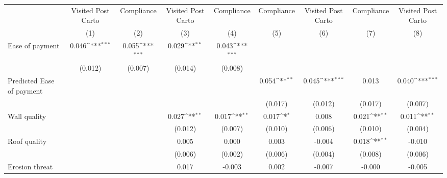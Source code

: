 {
\def\sym#1{\ifmmode^{#1}\else\(^{#1}\)\fi}
\begin{tabular}{l*{8}{c}}
\hline\hline
                &\multicolumn{1}{c}{Visited Post Carto}&\multicolumn{1}{c}{Compliance}&\multicolumn{1}{c}{Visited Post Carto}&\multicolumn{1}{c}{Compliance}&\multicolumn{1}{c}{Compliance}&\multicolumn{1}{c}{Visited Post Carto}&\multicolumn{1}{c}{Compliance}&\multicolumn{1}{c}{Visited Post Carto}\\
                &\multicolumn{1}{c}{(1)}         &\multicolumn{1}{c}{(2)}         &\multicolumn{1}{c}{(3)}         &\multicolumn{1}{c}{(4)}         &\multicolumn{1}{c}{(5)}         &\multicolumn{1}{c}{(6)}         &\multicolumn{1}{c}{(7)}         &\multicolumn{1}{c}{(8)}         \\
\hline
Ease of payment &    0.046\sym{***}&    0.055\sym{***}&    0.029\sym{**} &    0.043\sym{***}&                  &                  &                  &                  \\
                &  (0.012)         &  (0.007)         &  (0.014)         &  (0.008)         &                  &                  &                  &                  \\
Predicted Ease of payment&                  &                  &                  &                  &    0.054\sym{**} &    0.045\sym{***}&    0.013         &    0.040\sym{***}\\
                &                  &                  &                  &                  &  (0.017)         &  (0.012)         &  (0.017)         &  (0.007)         \\
Wall quality    &                  &                  &    0.027\sym{**} &    0.017\sym{**} &    0.017\sym{*}  &    0.008         &    0.021\sym{**} &    0.011\sym{**} \\
                &                  &                  &  (0.012)         &  (0.007)         &  (0.010)         &  (0.006)         &  (0.010)         &  (0.004)         \\
Roof quality    &                  &                  &    0.005         &    0.000         &    0.003         &   -0.004         &    0.018\sym{**} &   -0.010         \\
                &                  &                  &  (0.006)         &  (0.002)         &  (0.006)         &  (0.004)         &  (0.008)         &  (0.006)         \\
Erosion threat  &                  &                  &    0.017         &   -0.003         &    0.002         &   -0.007         &   -0.000         &   -0.005         \\

\end{tabular}}
